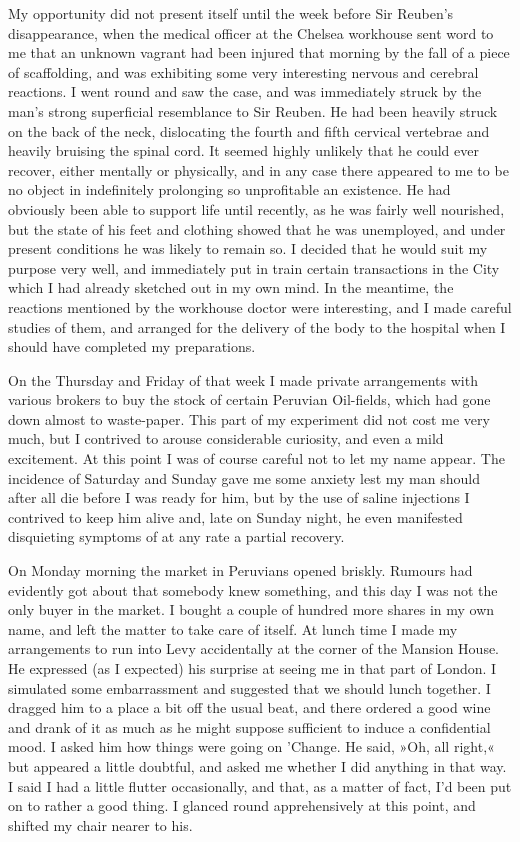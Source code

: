 My opportunity did not present itself until the week before Sir Reuben's disappearance, when the medical officer at the Chelsea workhouse sent word to me that an unknown vagrant had been injured that morning by the fall of a piece of scaffolding, and was exhibiting some very interesting nervous and cerebral reactions. I went round and saw the case, and was immediately struck by the man's strong superficial resemblance to Sir Reuben. He had been heavily struck on the back of the neck, dislocating the fourth and fifth cervical vertebrae and heavily bruising the spinal cord. It seemed highly unlikely that he could ever recover, either mentally or physically, and in any case there appeared to me to be no object in indefinitely prolonging so unprofitable an existence. He had obviously been able to support life until recently, as he was fairly well nourished, but the state of his feet and clothing showed that he was unemployed, and under present conditions he was likely to remain so. I decided that he would suit my purpose very well, and immediately put in train certain transactions in the City which I had already sketched out in my own mind. In the meantime, the reactions mentioned by the workhouse doctor were interesting, and I made careful studies of them, and arranged for the delivery of the body to the hospital when I should have completed my preparations.

On the Thursday and Friday of that week I made private arrangements with various brokers to buy the stock of certain Peruvian Oil-fields, which had gone down almost to waste-paper. This part of my experiment did not cost me very much, but I contrived to arouse considerable curiosity, and even a mild excitement. At this point I was of course careful not to let my name appear. The incidence of Saturday and Sunday gave me some anxiety lest my man should after all die before I was ready for him, but by the use of saline injections I contrived to keep him alive and, late on Sunday night, he even manifested disquieting symptoms of at any rate a partial recovery.

On Monday morning the market in Peruvians opened briskly. Rumours had evidently got about that somebody knew something, and this day I was not the only buyer in the market. I bought a couple of hundred more shares in my own name, and left the matter to take care of itself. At lunch time I made my arrangements to run into Levy accidentally at the corner of the Mansion House. He expressed (as I expected) his surprise at seeing me in that part of London. I simulated some embarrassment and suggested that we should lunch together. I dragged him to a place a bit off the usual beat, and there ordered a good wine and drank of it as much as he might suppose sufficient to induce a confidential mood. I asked him how things were going on 'Change. He said, »Oh, all right,« but appeared a little doubtful, and asked me whether I did anything in that way. I said I had a little flutter occasionally, and that, as a matter of fact, I'd been put on to rather a good thing. I glanced round apprehensively at this point, and shifted my chair nearer to his.


